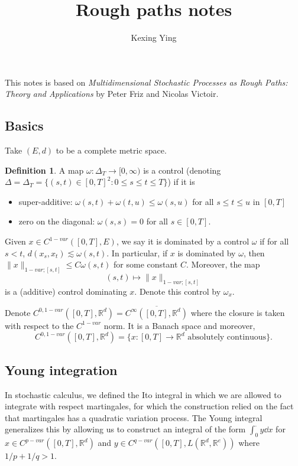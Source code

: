 \documentclass[]{article}
\theoremstyle{definition}
\theoremstyle{definition}
\newtheorem{definition}{Definition}
\begin{document}
\title{Rough paths notes}
\author{Kexing Ying}
\maketitle

This notes is based on \textit{Multidimensional Stochastic Processes as Rough Paths: Theory and Applications} 
by Peter Friz and Nicolas Victoir. 

\subsection*{Basics}

Take \((E, d)\) to be a complete metric space.

\begin{definition}
  A map \(\omega : \Delta_T \to [0, \infty)\) is a control 
  (denoting \(\Delta = \Delta_T = \{(s, t) \in [0, T]^2 : 0 \le s \le t \le T\}\)) if it is
  \begin{itemize}
    \item super-additive: \(\omega(s, t) + \omega(t, u) \le \omega(s, u)\) for all \(s \le t \le u\) in \([0, T]\)
    \item zero on the diagonal: \(\omega(s, s) = 0\) for all \(s \in [0, T]\).
  \end{itemize}
\end{definition}

Given \(x \in C^{1-var}([0, T], E)\), we say it is dominated by a control \(\omega\) if for all 
\(s < t\), \(d(x_s, x_t) \lesssim \omega(s, t)\). In particular, if \(x\) is dominated by \(\omega\), 
then \(\|x\|_{1-var; [s, t]} \le C\omega(s, t)\) for some constant \(C\). Moreover, the map 
\[(s, t) \mapsto \|x\|_{1-var; [s, t]}\]
is a (additive) control dominating \(x\). Denote this control by \(\omega_x\).

Denote \(C^{0, 1-var}([0, T], \mathbb{R}^d) = \overline{C^\infty([0, T], \mathbb{R}^d)}\) where the 
closure is taken with respect to the \(C^{1-var}\) norm. It is a Banach space and moreover, 
\[C^{0, 1-var}([0, T], \mathbb{R}^d) = \{x : [0, T] \to \mathbb{R}^d \text{ absolutely continuous}\}.\] 

\subsection*{Young integration}

In stochastic calculus, we defined the Ito integral in which we are allowed to integrate with respect 
martingales, for which the construction relied on the fact that martingales has a quadratic variation
process. The Young integral generalizes this by allowing us to construct an integral of the form 
\(\int_0^\cdot y \dd x\) for \(x \in C^{p-var}([0, T], \mathbb{R}^d)\) and 
\(y \in C^{q-var}([0, T], L(\mathbb{R}^d, \mathbb{R}^e))\) where \(1 / p + 1 / q > 1\).
\end{document}
